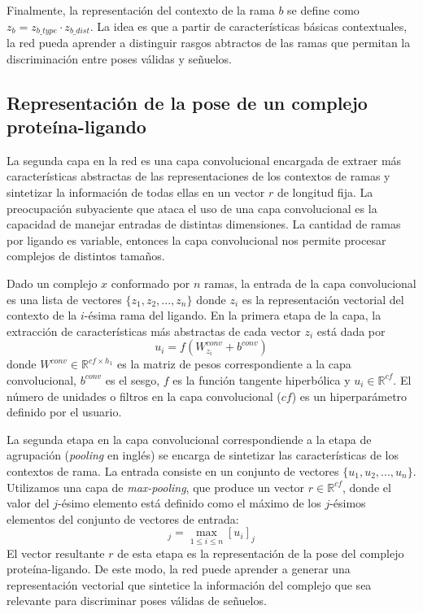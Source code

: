 Finalmente, la representación del contexto de la rama $b$ se define
como $z_b = z_{b\_type} \cdot z_{b\_dist}$. La idea es que a partir de
características básicas contextuales, la red pueda aprender a
distinguir rasgos abtractos de las ramas que permitan la
discriminación entre poses válidas y señuelos.

\subsection{Representación de la pose de un complejo proteína-ligando}

La segunda capa en la red es una capa convolucional encargada de
extraer más características abstractas de las representaciones de los
contextos de ramas y sintetizar la información de todas ellas en un
vector $r$ de longitud fija.  La preocupación subyaciente que ataca el
uso de una capa convolucional es la capacidad de manejar entradas de
distintas dimensiones. La cantidad de ramas por ligando es variable,
entonces la capa convolucional nos permite procesar complejos de
distintos tamaños.

Dado un complejo $x$ conformado por $n$ ramas, la entrada de la capa
convolucional es una lista de vectores $\{z_1, z_2, ..., z_n\}$ donde
$z_i$ es la representación vectorial del contexto de la $i$-ésima rama
del ligando. En la primera etapa de la capa, la extracción de
características más abstractas de cada vector $z_i$ está dada por
\begin{equation}
  u_i = f(W^{conv}_{z_i} + b^{conv})
\end{equation}
donde $W^{conv} \in \mathbb{R}^{cf \times h_1}$ es la matriz de pesos
correspondiente a la capa convolucional, $b^{conv}$ es el sesgo, $f$ es la
función tangente hiperbólica y $u_i \in \mathbb{R}^{cf}$. El número de
unidades o filtros en la capa convolucional ($cf$) es un hiperparámetro
definido por el usuario.

La segunda etapa en la capa convolucional correspondiende a la etapa
de agrupación (\textit{pooling} en inglés) se encarga de sintetizar
las características de los contextos de rama. La entrada consiste en
un conjunto de vectores $\{u_1, u_2, ..., u_n\}$. Utilizamos una capa
de \textit{max-pooling}, que produce un vector $r \in \mathbb{R}^{cf}$,
donde el valor del $j$-ésimo elemento está definido como el máximo de
los $j$-ésimos elementos del conjunto de vectores de entrada:
\begin{equation}
  [r]_j = \max_{1 \leq i \leq n} [u_i]_j
\end{equation}
El vector resultante $r$ de esta etapa es la representación de la pose
del complejo proteína-ligando. De este modo, la red puede aprender a
generar una representación vectorial que sintetice la información del
complejo que sea relevante para discriminar poses válidas de señuelos.


